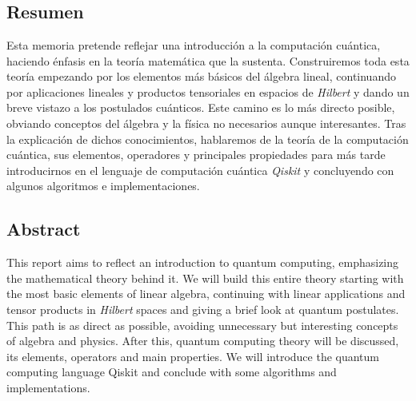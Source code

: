 \chapter*{}
\section*{Resumen}

Esta memoria pretende reflejar una introducción a la computación cuántica, haciendo énfasis en la teoría matemática que la sustenta. Construiremos toda esta teoría empezando por los elementos más básicos del álgebra lineal, continuando por aplicaciones lineales y productos tensoriales en espacios de \textit{Hilbert} y dando un breve vistazo a los postulados cuánticos. Este camino es lo más directo posible, obviando conceptos del álgebra y la física no necesarios aunque interesantes. Tras la explicación de dichos conocimientos, hablaremos de la teoría de la computación cuántica, sus elementos, operadores y principales propiedades para más tarde introducirnos en el lenguaje de computación cuántica \textit{Qiskit} y concluyendo con algunos algoritmos e implementaciones.

\section*{Abstract}

This report aims to reflect an introduction to quantum computing, emphasizing the mathematical theory behind it. We will build this entire theory starting with the most basic elements of linear algebra, continuing with linear applications and tensor products in \textit{Hilbert} spaces and giving a brief look at quantum postulates. This path is as direct as possible, avoiding unnecessary but interesting concepts of algebra and physics. After this, quantum computing theory will be discussed, its elements, operators and main properties. We will introduce the quantum computing language Qiskit and conclude with some algorithms and implementations.
